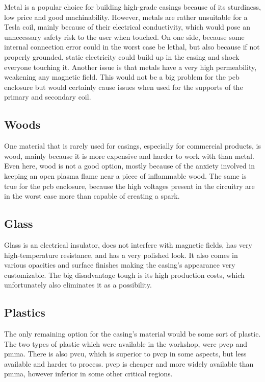 Metal is a popular choice for building high-grade casings because of its sturdiness, low price and good machinability. However, metals are rather unsuitable for a Tesla coil, mainly because of their electrical conductivity, which would pose an unnecessary safety risk to the user when touched. On one side, because some internal connection error could in the worst case be lethal, but also because if not properly grounded, static electricity could build up in the casing and shock everyone touching it. Another issue is that metals have a very high permeability, weakening any magnetic field. This would not be a big problem for the \gls{pcb} enclosure but would certainly cause issues when used for the supports of the primary and secondary coil.

\subsection{Woods}

One material that is rarely used for casings, especially for commercial products, is wood, mainly because it is more expensive and harder to work with than metal. Even here, wood is not a good option, mostly because of the anxiety involved in keeping an open plasma flame near a piece of inflammable wood. The same is true for the \gls{pcb} enclosure, because the high voltages present in the circuitry are in the worst case more than capable of creating a spark.

\subsection{Glass}

Glass is an electrical insulator, does not interfere with magnetic fields, has very high-temperature resistance, and has a very polished look. It also comes in various opacities and surface finishes making the casing's appearance very customizable. The big disadvantage tough is its high production costs, which unfortunately also eliminates it as a possibility.

\subsection{Plastics}

The only remaining option for the casing's material would be some sort of plastic. The two types of plastic which were available in the workshop, were \gls{pvcp} and \gls{pmma}. There is also \gls{pvcu}, which is superior to \gls{pvcp} in some aspects, but less available and harder to process. \gls{pvcp} is cheaper and more widely available than \gls{pmma}, however inferior in some other critical regions.

